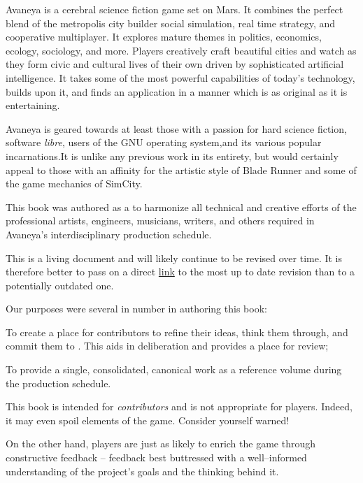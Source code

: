 

Avaneya is a cerebral science fiction game set on Mars. It combines the perfect blend of the metropolis city builder social simulation, real time strategy, and cooperative multiplayer. It explores mature themes in politics, economics, ecology, sociology, and more. Players creatively craft beautiful cities and watch as they form civic and cultural lives of their own driven by sophisticated artificial intelligence. It takes some of the most powerful capabilities of today's technology, builds upon it, and finds an application in a manner which is as original as it is entertaining.

Avaneya is geared towards at least those with a passion for hard science fiction, software {\it libre}, users of the GNU operating system, and its various popular incarnations. It is unlike any previous work in its entirety, but would certainly appeal to those with an affinity for the artistic style of Blade Runner and some of the game mechanics of SimCity. 

This book was authored as a  to harmonize all technical and creative efforts of the professional artists, engineers, musicians, writers, and others required in Avaneya's interdisciplinary production schedule.

This is a living document and will likely continue to be revised over time. It is therefore better to pass on a direct \href{\LatestHandbookURL}{link} to the most up to date revision than to a potentially outdated one.

Our purposes were several in number in authoring this book:

\startitemize[4]
\item
To create a place for contributors to refine their ideas, think them through, and commit them to . This aids in deliberation and provides a place for review;

\item
To provide a single, consolidated, canonical work as a reference volume during the production schedule.
\stopitemize

This book is intended for {\it contributors} and is not appropriate for players. Indeed, it may even spoil elements of the game. Consider yourself warned!

On the other hand, players are just as likely to enrich the game through constructive feedback -- feedback best buttressed with a well--informed understanding of the project's goals and the thinking behind it. 

\StopChapter

